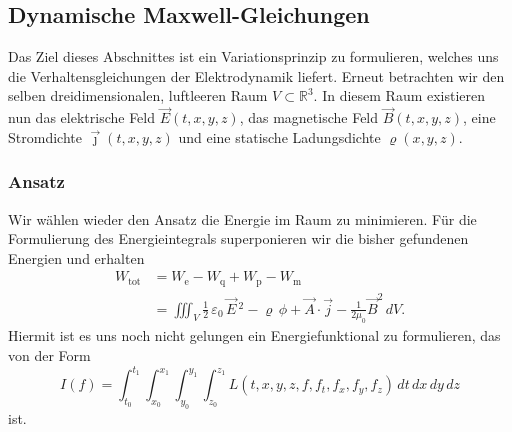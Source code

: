 \subsection{Dynamische Maxwell-Gleichungen}
Das Ziel dieses Abschnittes ist ein Variationsprinzip zu formulieren, welches uns die Verhaltensgleichungen der Elektrodynamik liefert. 
Erneut betrachten wir den selben dreidimensionalen, luftleeren Raum $V \subset \mathbb{R}^3$. In diesem Raum existieren nun das elektrische Feld $\vec{E}(t,x,y,z)$, das magnetische Feld $\vec{B}(t,x,y,z)$, eine Stromdichte $\vec{\jmath}(t,x,y,z)$ und eine statische Ladungsdichte $\varrho(x,y,z)$.

\subsubsection{Ansatz}
Wir wählen wieder den Ansatz die Energie im Raum zu minimieren. Für die Formulierung des Energieintegrals superponieren wir die bisher gefundenen Energien und erhalten
\begin{align*}
	W_{\text{tot}}
	&=
	W_{\text{e}} - W_{\text{q}} + W_{\text{p}} - W_{\text{m}}
				\\
				&= \iiint_V \frac{1}{2}\,\varepsilon_0\,\vec{E}\,^2 - \varrho \, \phi
				+ \vec{A}\cdot\vec{j} - \frac{1}{2\mu_0}\vec{B}^2 \, dV.
\end{align*}
Hiermit ist es uns noch nicht gelungen ein Energiefunktional zu formulieren, das von der Form
\[
I(f) = \int_{t_0}^{t_1} \int_{x_0}^{x_1} \int_{y_0}^{y_1} \int_{z_0}^{z_1} L(t,x,y,z,f,f_t,f_x,f_y,f_z)\,dt\,dx\,dy\,dz 
\]
ist.



